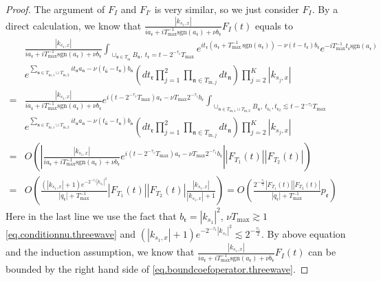 \begin{proof}
The argument of $F_{I}$ and $F_{I'}$ is very similar, so we just consider $F_{I}$. By a direct calculation, we know that $\frac{|k_{s_1,x}|}{ia_{\mathfrak{r}}+iT^{-1}_{\text{max}} \text{sgn}(a_{\mathfrak{r}})+\nu b_{\mathfrak{r}} }F_{I}(t)$ equals to
\begin{equation}
    \begin{split}
        &\frac{|k_{s_1,x}|}{ia_{\mathfrak{r}}+iT^{-1}_{\text{max}} \text{sgn}(a_{\mathfrak{r}})+\nu b_{\mathfrak{r}} } \int_{\cup_{\mathfrak{n}\in T_{\text{in}}} B_{\mathfrak{n}},\ t_{\mathfrak{r}}=t-2^{-\tau_{1}}T_{\text{max}}} e^{it_{\mathfrak{r}}(a_{\mathfrak{r}}+T^{-1}_{\text{max}}\, \text{sgn}(a_{\mathfrak{r}}))- \nu(t-t_{\mathfrak{r}})b_{\mathfrak{r}}} e^{-iT^{-1}_{\text{max}}t_{\mathfrak{r}} \text{sgn}(a_{\mathfrak{r}})} 
        \\
        &e^{\sum_{\mathfrak{n}\in T_{\text{in},1}\cup T_{\text{in},2}} it_{\mathfrak{n}} a_{\mathfrak{n}} - \nu(t_{\widehat{\mathfrak{n}}}-t_{\mathfrak{n}})b_{\mathfrak{n}}} \left(dt_{\mathfrak{r}}\prod_{j=1}^2\prod_{\mathfrak{n}\in T_{\text{in},j}}dt_{\mathfrak{n}}  \right)\prod^K_{j=2}|k_{s_j,x}|
        \\
        =&\frac{|k_{s_1,x}|}{ia_{\mathfrak{r}}+iT^{-1}_{\text{max}} \text{sgn}(a_{\mathfrak{r}})+\nu b_{\mathfrak{r}} }  e^{i(t-2^{-\tau_{1}}T_{\text{max}})a_{\mathfrak{r}}- \nu T_{\text{max}} 2^{-\tau_{1}}b_{\mathfrak{r}}}\int_{\cup_{\mathfrak{n}\in T_{\text{in},1}\cup T_{\text{in},2}} B_{\mathfrak{n}},\ t_{\mathfrak{r}_1}, t_{\mathfrak{r}_2}\lesssim t-2^{-\tau_{1}}T_{\text{max}}}
        \\
        &  e^{\sum_{\mathfrak{n}\in T_{\text{in},1}\cup T_{\text{in},2}} it_{\mathfrak{n}} a_{\mathfrak{n}} - \nu(t_{\widehat{\mathfrak{n}}}-t_{\mathfrak{n}})b_{\mathfrak{n}}}\left(dt_{\mathfrak{r}}\prod_{j=1}^2\prod_{\mathfrak{n}\in T_{\text{in},j}}dt_{\mathfrak{n}}  \right)\prod^K_{j=2}|k_{s_j,x}|
        \\
        =&O\left(\left|\frac{|k_{s_1,x}|}{ia_{\mathfrak{r}}+iT^{-1}_{\text{max}} \text{sgn}(a_{\mathfrak{r}})+\nu b_{\mathfrak{r}} }  e^{i(t-2^{-\tau_{1}}T_{\text{max}})a_{\mathfrak{r}}- \nu T_{\text{max}} 2^{-\tau_{1}}b_{\mathfrak{r}}}\right||F_{T_1}(t)| |F_{T_2}(t)|\right)
        \\
        =&O\left(\frac{(|k_{s_1,x}|+1)e^{- 2^{-\tau_{1}}|k_{s_1}|^2} }{|q_{\mathfrak{r}}|+T^{-1}_{\text{max}}} |F_{T_1}(t)| |F_{T_2}(t)|\frac{|k_{s_1,x}|}{|k_{s_1,x}|+1}\right)=O\left(\frac{2^{-\frac{\tau_{1}}{2}}|F_{T_1}(t)| |F_{T_2}(t)|}{|q_{\mathfrak{r}}|+T^{-1}_{\text{max}}}p_{\mathfrak{e}}\right)
    \end{split}
\end{equation}
Here in the last line we use the fact that $b_{\mathfrak{r}}=|k_{s_1}|^2$, $\nu T_{\text{max}}\gtrsim 1$ \eqref{eq.conditionnu.threewave} and $(|k_{s_1,x}|+1)e^{- 2^{-\tau_{1}}|k_{s_1}|^2} \lesssim 2^{-\frac{\tau_{1}}{2}}$. By above equation and the induction assumption, we know that $\frac{|k_{s_1,x}|}{ia_{\mathfrak{r}}+iT^{-1}_{\text{max}} \text{sgn}(a_{\mathfrak{r}})+\nu b_{\mathfrak{r}} }F_{I}(t)$ can be bounded by the right hand side of \eqref{eq.boundcoefoperator.threewave}.


\end{proof}
